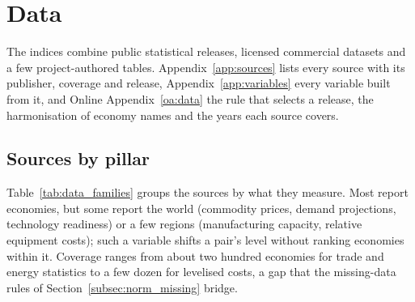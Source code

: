 
\section{Data}\label{sec:data}

The indices combine public statistical releases, licensed commercial datasets and a few
project-authored tables. Appendix~\ref{app:sources} lists every source with its publisher,
coverage and release, Appendix~\ref{app:variables} every variable built from it, and Online
Appendix~\ref{oa:data} the rule that selects a release, the harmonisation of economy names and
the years each source covers.

\subsection{Sources by pillar}\label{subsec:data_families}

Table~\ref{tab:data_families} groups the sources by what they measure. Most report economies,
but some report the world (commodity prices, demand projections, technology readiness) or a few
regions (manufacturing capacity, relative equipment costs); such a variable shifts a pair's level
without ranking economies within it. Coverage ranges from about two hundred economies for trade
and energy statistics to a few dozen for levelised costs, a gap that the missing-data rules of
Section~\ref{subsec:norm_missing} bridge.

